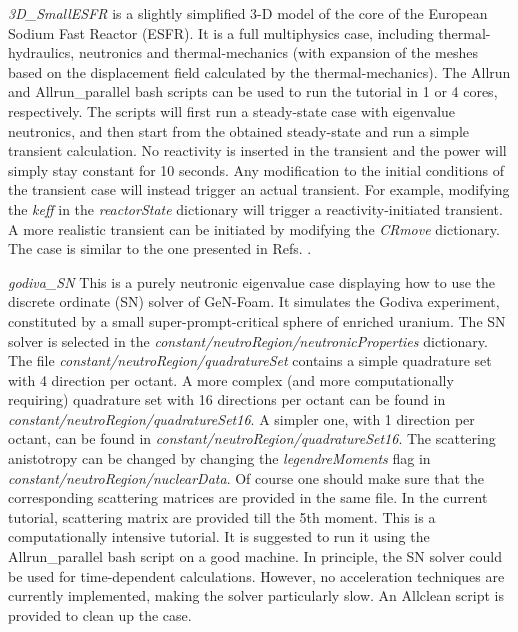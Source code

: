 \begin{DoxyItemize}
\item {\itshape 3\+D\+\_\+\+Small\+E\+S\+FR} is a slightly simplified 3-\/D model of the core of the European Sodium Fast Reactor (E\+S\+FR). It is a full multiphysics case, including thermal-\/hydraulics, neutronics and thermal-\/mechanics (with expansion of the meshes based on the displacement field calculated by the thermal-\/mechanics). The Allrun and Allrun\+\_\+parallel bash scripts can be used to run the tutorial in 1 or 4 cores, respectively. The scripts will first run a steady-\/state case with eigenvalue neutronics, and then start from the obtained steady-\/state and run a simple transient calculation. No reactivity is inserted in the transient and the power will simply stay constant for 10 seconds. Any modification to the initial conditions of the transient case will instead trigger an actual transient. For example, modifying the {\itshape keff} in the {\itshape reactor\+State} dictionary will trigger a reactivity-\/initiated transient. A more realistic transient can be initiated by modifying the {\itshape C\+Rmove} dictionary. The case is similar to the one presented in Refs. \cite{FIORINA201524} \cite{Fiorina2015ApplicationCodes}.
\item {\itshape godiva\+\_\+\+SN} This is a purely neutronic eigenvalue case displaying how to use the discrete ordinate (SN) solver of Ge\+N-\/\+Foam. It simulates the Godiva experiment, constituted by a small super-\/prompt-\/critical sphere of enriched uranium. The SN solver is selected in the {\itshape constant/neutro\+Region/neutronic\+Properties} dictionary. The file {\itshape constant/neutro\+Region/quadrature\+Set} contains a simple quadrature set with 4 direction per octant. A more complex (and more computationally requiring) quadrature set with 16 directions per octant can be found in {\itshape constant/neutro\+Region/quadrature\+Set16}. A simpler one, with 1 direction per octant, can be found in {\itshape constant/neutro\+Region/quadrature\+Set16}. The scattering anistotropy can be changed by changing the {\itshape legendre\+Moments} flag in {\itshape constant/neutro\+Region/nuclear\+Data}. Of course one should make sure that the corresponding scattering matrices are provided in the same file. In the current tutorial, scattering matrix are provided till the 5th moment. This is a computationally intensive tutorial. It is suggested to run it using the Allrun\+\_\+parallel bash script on a good machine. In principle, the SN solver could be used for time-\/dependent calculations. However, no acceleration techniques are currently implemented, making the solver particularly slow. An Allclean script is provided to clean up the case.
\end{DoxyItemize}

